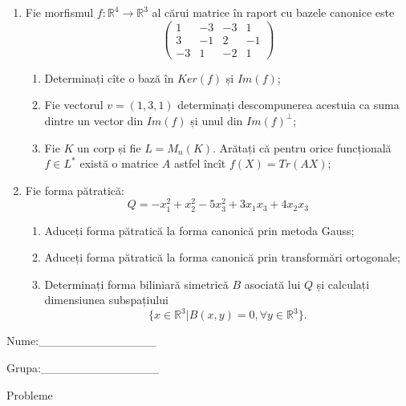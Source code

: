 \documentclass{article}
\begin{document}
\begin{enumerate}
 \item Fie morfismul $f:\mathbb{R}^4 \to \mathbb{R}^3$ al cărui matrice în raport cu bazele canonice este
$$\begin{pmatrix}
1&-3&-3&1\\
3&-1&2&-1\\
-3&1&-2&1
\end{pmatrix}$$

\begin{enumerate}
\item Determinați cîte o bază în $Ker(f)$ și $Im(f)$;
\item Fie vectorul $v=(1,3,1)$ determinați descompunerea acestuia ca suma dintre un vector din $Im(f)$ și unul din $Im(f)^\perp$;
\item Fie $K$ un corp și fie $L=M_n(K)$. Arătați că pentru orice funcțională $f \in L^*$ există o matrice $A$ astfel încît $f(X)=Tr(AX)$;
\end{enumerate}
\item Fie forma pătratică:
$$Q= -x_1^2+x_2^2-5x_3^2+3x_1x_3+4x_2x_3$$

\begin{enumerate}
\item Aduceți forma pătratică la forma canonică prin metoda Gauss;
\item Aduceți forma pătratică la forma canonică prin transformări ortogonale;
\item Determinați forma biliniară simetrică $B$ asociată lui $Q$ și calculați dimensiunea subspațiului
$$\{x \in \mathbb{R}^3 | B(x,y)=0,\forall y \in \mathbb{R}^3\}.$$

\end{enumerate}
\end{enumerate}
\newpage
\begin{flushright}
Nume:\_\_\_\_\_\_\_\_\_\_\_\_\_\_
 
 
Grupa:\_\_\_\_\_\_\_\_\_\_\_\_\_\_
\end{flushright}
\begin{center}
\vspace{2cm}
{\Large Probleme}
\vspace{2cm}
\end{center}
\end{document}
